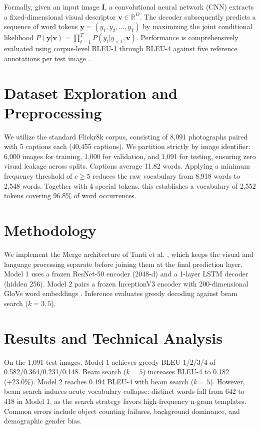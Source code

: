 \documentclass[conference]{IEEEtran}
\begin{document}
Formally, given an input image $\mathbf{I}$, a convolutional neural network (CNN) extracts a fixed-dimensional visual descriptor $\mathbf{v} \in \mathbb{R}^{D}$. The decoder subsequently predicts a sequence of word tokens $\mathbf{y} = (y_1, y_2, \dots, y_T)$ by maximizing the joint conditional likelihood $P(\mathbf{y}|\mathbf{v}) = \prod_{t=1}^T P(y_t | y_{<t}, \mathbf{v})$. Performance is comprehensively evaluated using corpus-level BLEU-1 through BLEU-4 against five reference annotations per test image \cite{papineni2002}.

\section{Dataset Exploration and Preprocessing}
We utilize the standard Flickr8k corpus, consisting of 8,091 photographs paired with 5 captions each (40,455 captions). We partition strictly by image identifier: 6,000 images for training, 1,000 for validation, and 1,091 for testing, ensuring zero visual leakage across splits.
Captions average 11.82 words. Applying a minimum frequency threshold of $c \ge 5$ reduces the raw vocabulary from 8,918 words to 2,548 words. Together with 4 special tokens, this establishes a vocabulary of 2,552 tokens covering 96.8\% of word occurrences.

\section{Methodology}
We implement the Merge architecture of Tanti et al. \cite{tanti2018}, which keeps the visual and language processing separate before joining them at the final prediction layer.
Model 1 uses a frozen ResNet-50 encoder (2048-d) and a 1-layer LSTM decoder (hidden 256). Model 2 pairs a frozen InceptionV3 encoder with 200-dimensional GloVe word embeddings \cite{pennington2014}. Inference evaluates greedy decoding against beam search ($k=3, 5$).

\section{Results and Technical Analysis}
On the 1,091 test images, Model 1 achieves greedy BLEU-1/2/3/4 of 0.582/0.364/0.231/0.148. Beam search ($k=5$) increases BLEU-4 to 0.182 (+23.0\%). Model 2 reaches 0.194 BLEU-4 with beam search ($k=5$).
However, beam search induces acute vocabulary collapse: distinct words fall from 642 to 418 in Model 1, as the search strategy favors high-frequency n-gram templates. Common errors include object counting failures, background dominance, and demographic gender bias.
\end{document}
